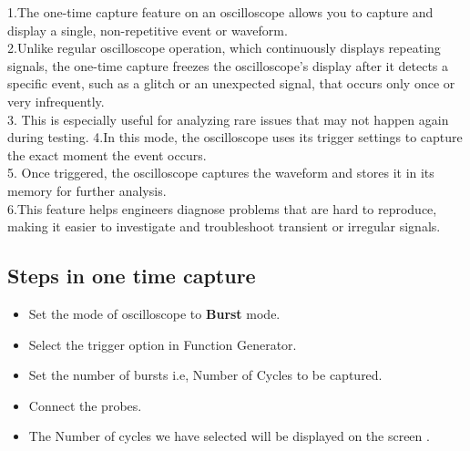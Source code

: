\noindent1.The one-time capture feature on an oscilloscope allows you to capture and display a single, non-repetitive event or waveform.\\ 2.Unlike regular oscilloscope operation, which continuously displays repeating signals, the one-time capture freezes the oscilloscope's display after it detects a specific event, such as a glitch or an unexpected signal, that occurs only once or very infrequently.\\3. This is especially useful for analyzing rare issues that may not happen again during testing.
4.In this mode, the oscilloscope uses its trigger settings to capture the exact moment the event occurs.\\5. Once triggered, the oscilloscope captures the waveform and stores it in its memory for further analysis.\\ 6.This feature helps engineers diagnose problems that are hard to reproduce, making it easier to investigate and troubleshoot transient or irregular signals.
\subsection{Steps in one time capture}
\begin{itemize}
    \item Set the mode of oscilloscope to \textbf{Burst} mode.
    \item Select the trigger option in Function Generator.
    \item Set the number of bursts i.e, Number of Cycles to be captured.
    \item Connect the probes.
    \item The Number of cycles we have selected will be displayed on the screen .
\end{itemize}
